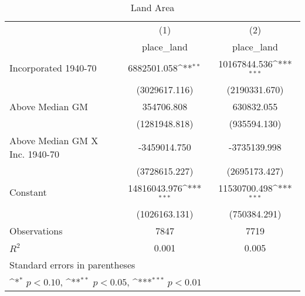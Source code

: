 \begin{table}[htbp]\centering
\def\sym#1{\ifmmode^{#1}\else\(^{#1}\)\fi}
\caption{Land Area}
\begin{tabular}{l*{2}{c}}
\hline\hline
                    &\multicolumn{1}{c}{(1)}&\multicolumn{1}{c}{(2)}\\
                    &\multicolumn{1}{c}{place\_land}&\multicolumn{1}{c}{place\_land}\\
\hline
Incorporated 1940-70& 6882501.058\sym{**} &10167844.536\sym{***}\\
                    &(3029617.116)         &(2190331.670)         \\
[1em]
Above Median GM     &  354706.808         &  630832.055         \\
                    &(1281948.818)         &(935594.130)         \\
[1em]
Above Median GM X Inc. 1940-70&-3459014.750         &-3735139.998         \\
                    &(3728615.227)         &(2695173.427)         \\
[1em]
Constant            &14816043.976\sym{***}&11530700.498\sym{***}\\
                    &(1026163.131)         &(750384.291)         \\
\hline
Observations        &        7847         &        7719         \\
\(R^{2}\)           &       0.001         &       0.005         \\
\hline\hline
\multicolumn{3}{l}{\footnotesize Standard errors in parentheses}\\
\multicolumn{3}{l}{\footnotesize \sym{*} \(p<0.10\), \sym{**} \(p<0.05\), \sym{***} \(p<0.01\)}\\
\end{tabular}
\end{table}
